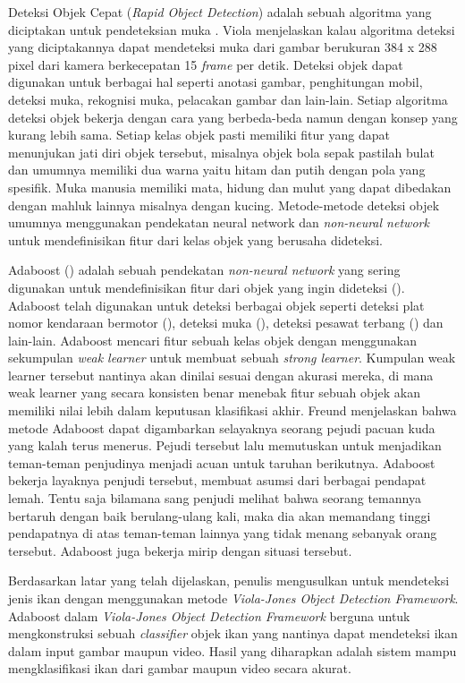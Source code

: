 Deteksi Objek Cepat (\emph{Rapid Object Detection}) adalah sebuah algoritma yang 
diciptakan untuk pendeteksian muka \cite{violaetal}. Viola 
menjelaskan kalau algoritma deteksi yang diciptakannya dapat mendeteksi 
muka dari gambar berukuran 384 x 288 pixel dari kamera berkecepatan 15 
\textit{frame} per detik. Deteksi objek dapat digunakan untuk berbagai hal seperti 
anotasi gambar, penghitungan mobil, deteksi muka, rekognisi muka, pelacakan 
gambar dan lain-lain. Setiap algoritma deteksi objek bekerja dengan cara yang 
berbeda-beda namun dengan konsep yang kurang lebih sama. Setiap kelas objek 
pasti memiliki fitur yang dapat menunjukan jati diri objek tersebut, misalnya 
objek bola sepak pastilah bulat dan umumnya memiliki dua warna yaitu hitam dan 
putih dengan pola yang spesifik. Muka manusia memiliki mata, hidung dan mulut 
yang dapat dibedakan dengan mahluk lainnya misalnya dengan kucing. Metode-metode 
deteksi objek umumnya menggunakan pendekatan neural network dan 
\textit{non-neural network} untuk mendefinisikan fitur dari kelas objek yang 
berusaha dideteksi.

Adaboost (\cite{freundetal}) adalah sebuah pendekatan \textit{non-neural network} 
yang sering digunakan untuk mendefinisikan fitur dari objek yang ingin 
dideteksi (\cite{weber}). Adaboost telah digunakan untuk deteksi berbagai objek 
seperti deteksi plat nomor kendaraan bermotor (\cite{hoetal}), deteksi muka 
(\cite{violaetal}), deteksi pesawat terbang (\cite{freundetal}) dan lain-lain. 
Adaboost mencari fitur sebuah kelas objek dengan menggunakan sekumpulan 
\emph{weak learner} untuk membuat sebuah \emph{strong learner}. 
Kumpulan weak learner tersebut nantinya akan dinilai sesuai dengan akurasi 
mereka, di mana weak learner yang secara konsisten benar menebak fitur sebuah 
objek akan memiliki nilai lebih dalam keputusan klasifikasi akhir. Freund 
menjelaskan bahwa metode Adaboost dapat digambarkan selayaknya seorang pejudi 
pacuan kuda yang kalah terus menerus. Pejudi tersebut lalu memutuskan untuk 
menjadikan teman-teman penjudinya menjadi acuan untuk taruhan berikutnya. 
Adaboost bekerja layaknya penjudi tersebut, membuat asumsi dari berbagai 
pendapat lemah. Tentu saja bilamana sang penjudi melihat bahwa seorang 
temannya bertaruh dengan baik berulang-ulang kali, maka dia akan 
memandang tinggi pendapatnya di atas teman-teman lainnya yang tidak menang 
sebanyak orang tersebut. Adaboost juga bekerja mirip dengan situasi tersebut.

Berdasarkan latar yang telah dijelaskan, penulis mengusulkan untuk mendeteksi 
jenis ikan dengan menggunakan metode \emph{Viola-Jones Object Detection Framework}. 
Adaboost dalam \emph{Viola-Jones Object Detection Framework} berguna untuk 
mengkonstruksi sebuah \emph{classifier} objek ikan yang nantinya dapat mendeteksi 
ikan dalam input gambar maupun video. Hasil yang diharapkan adalah sistem 
mampu mengklasifikasi ikan dari gambar maupun video secara akurat.


